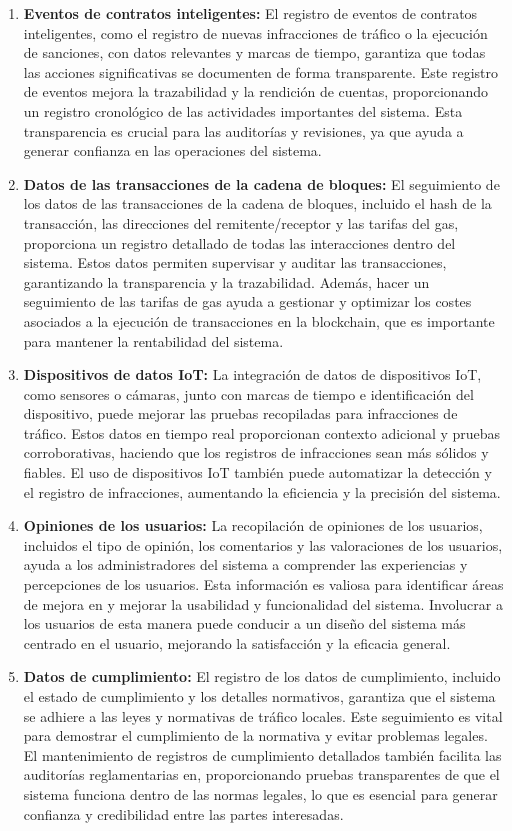 \begin{enumerate}
        \item \textbf{Eventos de contratos inteligentes:} El registro de eventos de contratos inteligentes, como el registro de nuevas infracciones de tráfico o la ejecución de sanciones, con datos relevantes y marcas de tiempo, garantiza que todas las acciones significativas se documenten de forma transparente. Este registro de eventos mejora la trazabilidad y la rendición de cuentas, proporcionando un registro cronológico de las actividades importantes del sistema. Esta transparencia es crucial para las auditorías y revisiones, ya que ayuda a generar confianza en las operaciones del sistema. 
        \item \textbf{Datos de las transacciones de la cadena de bloques: } El seguimiento de los datos de las transacciones de la cadena de bloques, incluido el hash de la transacción, las direcciones del remitente/receptor y las tarifas del gas, proporciona un registro detallado de todas las interacciones dentro del sistema. Estos datos permiten supervisar y auditar las transacciones, garantizando la transparencia y la trazabilidad. Además, hacer un seguimiento de las tarifas de gas ayuda a gestionar y optimizar los costes asociados a la ejecución de transacciones en la blockchain, que es importante para mantener la rentabilidad del sistema. 
        \item \textbf{Dispositivos de datos IoT:} La integración de datos de dispositivos IoT, como sensores o cámaras, junto con marcas de tiempo e identificación del dispositivo, puede mejorar las pruebas recopiladas para infracciones de tráfico. Estos datos en tiempo real proporcionan contexto adicional y pruebas corroborativas, haciendo que los registros de infracciones sean más sólidos y fiables. El uso de dispositivos IoT también puede automatizar la detección y el registro de infracciones, aumentando la eficiencia y la precisión del sistema.
            \item \textbf{Opiniones de los usuarios: } La recopilación de opiniones de los usuarios, incluidos el tipo de opinión, los comentarios y las valoraciones de los usuarios, ayuda a los administradores del sistema a comprender las experiencias y percepciones de los usuarios. Esta información es valiosa para identificar áreas de mejora en y mejorar la usabilidad y funcionalidad del sistema. Involucrar a los usuarios de esta manera puede conducir a un diseño del sistema más centrado en el usuario, mejorando la satisfacción y la eficacia general. 
                \item \textbf{Datos de cumplimiento: } El registro de los datos de cumplimiento, incluido el estado de cumplimiento y los detalles normativos, garantiza que el sistema se adhiere a las leyes y normativas de tráfico locales. Este seguimiento es vital para demostrar el cumplimiento de la normativa y evitar problemas legales. El mantenimiento de registros de cumplimiento detallados también facilita las auditorías reglamentarias en, proporcionando pruebas transparentes de que el sistema funciona dentro de las normas legales, lo que es esencial para generar confianza y credibilidad entre las partes interesadas.
\end{enumerate}

